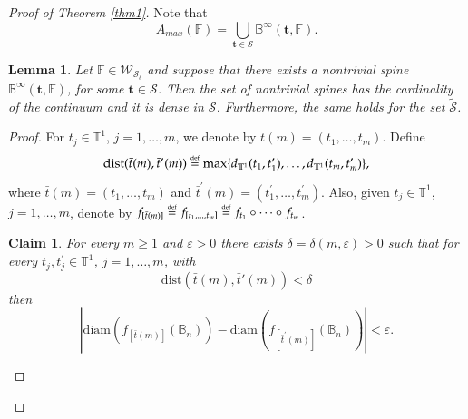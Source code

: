 \documentclass[11pt,reqno]{amsart}
\theoremstyle{plain}
\newtheorem{lemma}[theorem]{Lemma}
\newtheorem{claim}[theorem]{Claim}
\newtheorem*{theorem A}{Theorem A}
\newtheorem*{theorem B}{Theorem B}
\newtheorem*{theorem C}{Theorem C}
\newtheorem*{theorem 1}{Theorem 1}
\newtheorem*{theorem 2}{Theorem 2}
\newtheorem*{theorem 3}{Theorem 3}
\newcommand{\eqdef}{\stackrel{\scriptscriptstyle\rm def}{=}}
\numberwithin{equation}{section}
\begin{document}
\begin{proof}[Proof of Theorem \ref{thm1}]
 Note that
$$
A_{max}(\mathbb{F})=\bigcup_{\textbf{t} \in \mathcal{S}}\mathbb{B}^{\infty}(\textbf{t},\mathbb{F}).
$$

\begin{lemma}\label{corspine}
Let $\mathbb{F} \in \mathcal{W}_{\mathcal{S}_\ell}$ and suppose that there exists a nontrivial spine $ \mathbb{B}^{\infty}(\textbf{t},\mathbb{F})$, for some $\textbf{t} \in \mathcal{S}$. Then the set of nontrivial spines has the cardinality of the continuum and it is dense in $\mathcal{S}$. Furthermore, the same holds for the set $\widetilde{\mathcal{S}}$.
\end{lemma}

\begin{proof}
For $t_j \in \mathbb{T}^1$, $j=1, \dots, m$, we denote by $\bar t(m)=(t_1, \dots, t_m)$.
Define
$$\mathrm{dist} (\bar t(m) , \bar t'(m))\eqdef \max \{d_{\mathbb{T}^1}(t_1,t^{\prime}_1), \dots, d_{\mathbb{T}^1}(t_m,t^{\prime}_m) \},$$
where $\bar t(m)=(t_1, \dots, t_m)$ and $\bar t^{\prime}(m)=(t^{\prime}_1, \dots, t^{\prime}_m)$. Also, given $t_j \in \mathbb{T}^1$, $j=1, \dots, m$, denote by $f_{[\bar t(m)]}\eqdef f_{[t_1, \dots, t_m]}\eqdef f_{t_1} \circ \dots \circ f_{t_m}$.

\begin{claim}\label{c2121}
For every $m \geq 1$ and $\varepsilon > 0$ there exists $\delta =\delta(m, \varepsilon)> 0$ such that for every $t_j, t^{\prime}_j \in \mathbb{T}^1$, $j=1, \dots, m$, with
\begin{equation*}
  \mathrm{dist} (\bar t(m) , \bar t'(m)) < \delta
\end{equation*}
then
\begin{equation*}
  |\text{diam}(f_{[\bar t(m)]}(\mathbb{B}_n)) - \text{diam}(f_{[\bar t^{\prime}(m)]}(\mathbb{B}_n))|< \varepsilon.
\end{equation*}
\end{claim}


\end{proof}
\end{proof}
\end{document}
